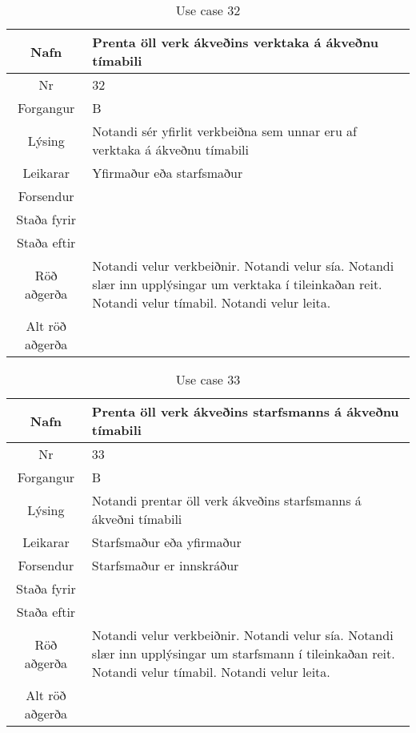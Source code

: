 \begin{table}[h!]\centering
\begin{tabular}{|c|p{10cm}|}
\hline
Nafn&Prenta öll verk ákveðins verktaka á ákveðnu tímabili\\
\hline
Nr&32\\
\hline
Forgangur&B\\
\hline
Lýsing&Notandi sér yfirlit verkbeiðna sem unnar eru af verktaka á ákveðnu tímabili\\
\hline
Leikarar&Yfirmaður eða starfsmaður\\
\hline
Forsendur&\\
\hline
Staða fyrir&\\
\hline
Staða eftir&\\
\hline
Röð aðgerða&Notandi velur verkbeiðnir. Notandi velur sía. Notandi slær inn upplýsingar um verktaka í tileinkaðan reit. Notandi velur tímabil. Notandi velur leita.\\
\hline
Alt röð aðgerða&\\
\hline
\end{tabular}
\caption{Use case 32}\label{tab:use_case_32}
\end{table}
\begin{table}[h!]\centering
\begin{tabular}{|c|p{10cm}|}
\hline
Nafn&Prenta öll verk ákveðins starfsmanns á ákveðnu tímabili\\
\hline
Nr&33\\
\hline
Forgangur&B\\
\hline
Lýsing&Notandi prentar öll verk ákveðins starfsmanns á ákveðni tímabili\\
\hline
Leikarar&Starfsmaður eða yfirmaður\\
\hline
Forsendur&Starfsmaður er innskráður\\
\hline
Staða fyrir&\\
\hline
Staða eftir&\\
\hline
Röð aðgerða&Notandi velur verkbeiðnir. Notandi velur sía. Notandi slær inn upplýsingar um starfsmann í tileinkaðan reit. Notandi velur tímabil. Notandi velur leita.\\
\hline
Alt röð aðgerða&\\
\hline
\end{tabular}
\caption{Use case 33}\label{tab:use_case_33}
\end{table}
